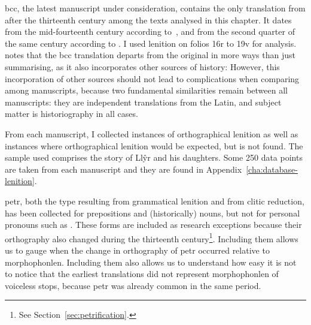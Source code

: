 \Acrfull{bcc}, the latest manuscript under consideration, contains the only translation from after the thirteenth century among the texts analysed in this chapter.
It dates from the mid-fourteenth century according to~\textcite[xlv]{Rob_Astudiaeth69}, and from the second quarter of the same century according to \textcite[xviii]{Jon_Brenhinedd71}.
I used lenition on folios 16r to 19v for analysis.
\Textcite{Rob_Testunau74} notes that the \gls{bcc} translation departs from the original in more ways than just summarising, as it also incorporates other sources of history:
However, this incorporation of other sources should not lead to complications when comparing among manuscripts, because two fundamental similarities remain between all manuscripts: they are independent translations from the Latin, and subject matter is historiography in all cases.

From each manuscript, I  collected instances of orthographical
lenition as well as instances  where orthographical lenition would
be expected, but is not found. The sample used comprises the
story of Llŷr and his daughters.  Some 250 data points are taken
from each manuscript and they are found in Appendix~\ref{cha:database-lenition}.

\Gls{petr}, both the type resulting from grammatical lenition and from clitic reduction, has been collected for prepositions
and (historically) nouns, but not for personal pronouns such
as . These forms are included 
as research exceptions because their orthography also changed during the
thirteenth century\footnote{See Section~\ref{sec:petrification}.}. Including them allows
us to gauge when the change in orthography of \gls{petr} occurred relative to \gls{morphophonlen}.
Including them also allows us to understand how easy it is not to notice that the earliest translations did not represent  \gls{morphophonlen} of voiceless stops, because \gls{petr} was already common in the same period.


